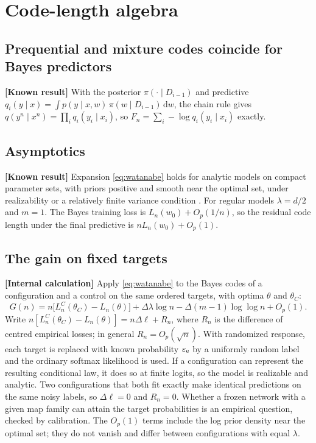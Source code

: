 \documentclass[11pt,a4paper]{article}
\newcommand{\eps}{\varepsilon}
\newcommand{\dd}{\mathrm d}
\newcommand{\evl}[2]{{\small\bfseries\color{#1}[#2]}}
\newcommand{\LKnown}{\evl{cknown}{Known result}}
\newcommand{\LCalc}{\evl{ccalc}{Internal calculation}}
\begin{document}
\section{Code-length algebra}
\label{app:codes}
\renewcommand{\theequation}{B.\arabic{equation}}
\setcounter{equation}{0}

\subsection{Prequential and mixture codes coincide for Bayes predictors}

\LKnown{} With the posterior $\pi(\cdot\mid D_{i-1})$ and predictive
$q_i(y\mid x)=\int p(y\mid x,w)\,\pi(w\mid D_{i-1})\,\dd w$, the chain rule
gives $q(y^n\mid x^n)=\prod_iq_i(y_i\mid x_i)$, so
$F_n=\sum_i-\log q_i(y_i\mid x_i)$ exactly.

\subsection{Asymptotics}

\LKnown{} Expansion \eqref{eq:watanabe} holds for analytic models on
compact parameter sets, with priors positive and smooth near the optimal
set, under realizability or a relatively finite variance condition
\cite{watanabe2009,watanabe2018}. For regular models $\lambda=d/2$ and
$m=1$. The Bayes training loss is $L_n(w_0)+O_p(1/n)$, so the residual
code length under the final predictive is $nL_n(w_0)+O_p(1)$.

\subsection{The gain on fixed targets}

\LCalc{} Apply \eqref{eq:watanabe} to the Bayes codes of a configuration
and a control on the same ordered targets, with optima $\theta$ and
$\theta_C$:
\begin{equation}
G(n)=n\bigl[L^C_n(\theta_C)-L_n(\theta)\bigr]+\Delta\lambda\log n
-\Delta(m-1)\log\log n+O_p(1).
\end{equation}
Write $n[L^C_n(\theta_C)-L_n(\theta)]=n\Delta\ell+R_n$, where $R_n$ is the
difference of centred empirical losses; in general $R_n=O_p(\sqrt n)$. With
randomized response, each target is replaced with known probability
$\eps_{\rm e}$ by a uniformly random label and the ordinary softmax
likelihood is used. If a configuration can represent the resulting
conditional law, it does so at finite logits, so the model is realizable
and analytic. Two configurations that both fit exactly make identical
predictions on the same noisy labels, so $\Delta\ell=0$ and $R_n=0$.
Whether a frozen network with a given map family can attain the target
probabilities is an empirical question, checked by calibration. The
$O_p(1)$ terms include the log prior density near the optimal set; they do
not vanish and differ between configurations with equal $\lambda$.
\end{document}

